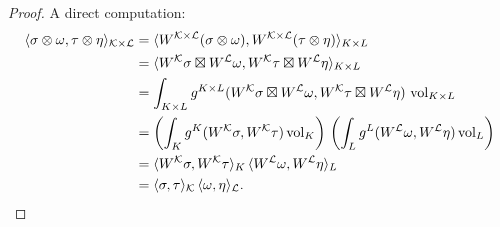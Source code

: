 \begin{proof}
  A direct computation:
  \begin{equation}
    \begin{split}
      \langle\sigma \otimes \omega,\tau \otimes \eta\rangle
      _{\mathcal{K} \times \mathcal{L}}
      & = \langle W^{\mathcal{K} \times \mathcal{L}}(\sigma \otimes \omega),W^{\mathcal{K} \times \mathcal{L}}(\tau \otimes \eta)\rangle
          _{K \times L} \\
      & = \langle W^{\mathcal{K}} \sigma \boxtimes W^{\mathcal{L}} \omega,W^{\mathcal{K}} \tau \boxtimes W^{\mathcal{L}} \eta\rangle
          _{K \times L} \\
      & = \int_{K \times L}
          g^{K \times L}(
            W^{\mathcal{K}} \sigma \boxtimes W^{\mathcal{L}} \omega,
            W^{\mathcal{K}} \tau \boxtimes W^{\mathcal{L}} \eta)\,
          \mathop{\rm vol}\nolimits_{K \times L} \\
      & = \left(
            \int_K g^K(W^{\mathcal{K}} \sigma, W^{\mathcal{K}} \tau) \mathop{\rm vol}\nolimits_K
          \right)\,
          \left(
            \int_L g^L(W^{\mathcal{L}} \omega, W^{\mathcal{L}} \eta) \mathop{\rm vol}\nolimits_L
          \right) \\
      & = \langle W^{\mathcal{K}} \sigma,W^{\mathcal{K}} \tau\rangle_K\,
          \langle W^{\mathcal{L}} \omega,W^{\mathcal{L}} \eta\rangle_L \\
      & = \langle\sigma,\tau\rangle_{\mathcal{K}}\,
          \langle\omega,\eta\rangle_{\mathcal{L}}.
    \end{split}
  \end{equation}
\end{proof}
